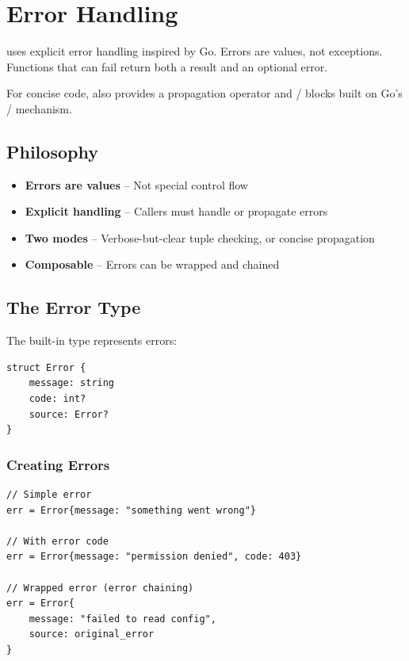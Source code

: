 \chapter{Error Handling}
\label{ch:errors}

\haira{} uses explicit error handling inspired by Go. Errors are values, not exceptions. Functions that can fail return both a result and an optional error.

For concise code, \haira{} also provides a  propagation operator and / blocks built on Go's / mechanism.

\section{Philosophy}

\begin{itemize}
    \item \textbf{Errors are values} -- Not special control flow
    \item \textbf{Explicit handling} -- Callers must handle or propagate errors
    \item \textbf{Two modes} -- Verbose-but-clear tuple checking, or concise  propagation
    \item \textbf{Composable} -- Errors can be wrapped and chained
\end{itemize}

\section{The Error Type}

The built-in  type represents errors:

\begin{lstlisting}
struct Error {
    message: string
    code: int?
    source: Error?
}
\end{lstlisting}

\subsection{Creating Errors}

\begin{lstlisting}
// Simple error
err = Error{message: "something went wrong"}

// With error code
err = Error{message: "permission denied", code: 403}

// Wrapped error (error chaining)
err = Error{
    message: "failed to read config",
    source: original_error
}
\end{lstlisting}

